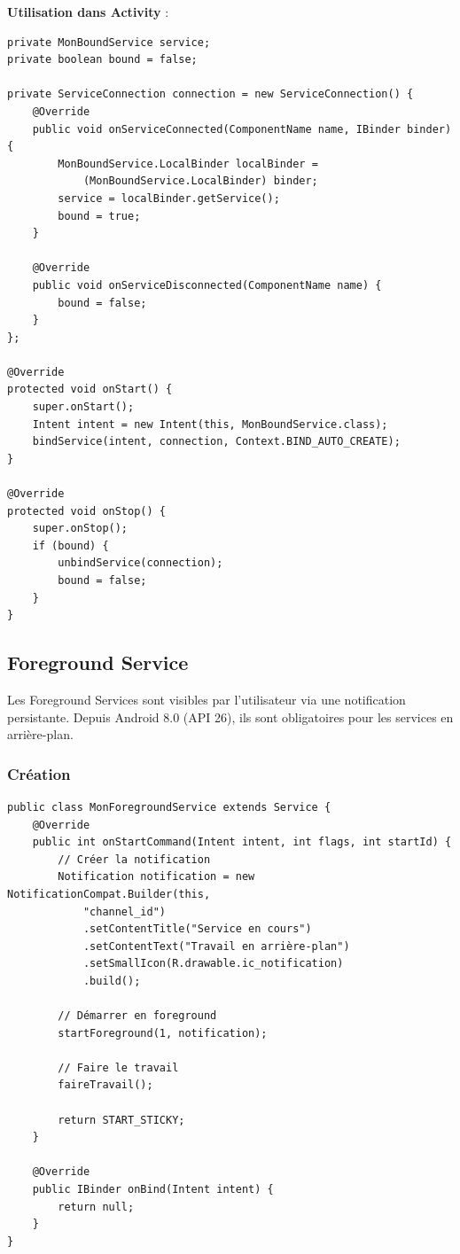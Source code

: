 \documentclass[11pt,a4paper]{article}
\begin{document}
\textbf{Utilisation dans Activity} :
\begin{lstlisting}
private MonBoundService service;
private boolean bound = false;

private ServiceConnection connection = new ServiceConnection() {
    @Override
    public void onServiceConnected(ComponentName name, IBinder binder) {
        MonBoundService.LocalBinder localBinder = 
            (MonBoundService.LocalBinder) binder;
        service = localBinder.getService();
        bound = true;
    }
    
    @Override
    public void onServiceDisconnected(ComponentName name) {
        bound = false;
    }
};

@Override
protected void onStart() {
    super.onStart();
    Intent intent = new Intent(this, MonBoundService.class);
    bindService(intent, connection, Context.BIND_AUTO_CREATE);
}

@Override
protected void onStop() {
    super.onStop();
    if (bound) {
        unbindService(connection);
        bound = false;
    }
}
\end{lstlisting}

\subsection{Foreground Service}

Les Foreground Services sont visibles par l'utilisateur via une notification persistante. Depuis Android 8.0 (API 26), ils sont obligatoires pour les services en arrière-plan.

\subsubsection{Création}

\begin{lstlisting}
public class MonForegroundService extends Service {
    @Override
    public int onStartCommand(Intent intent, int flags, int startId) {
        // Créer la notification
        Notification notification = new NotificationCompat.Builder(this, 
            "channel_id")
            .setContentTitle("Service en cours")
            .setContentText("Travail en arrière-plan")
            .setSmallIcon(R.drawable.ic_notification)
            .build();
        
        // Démarrer en foreground
        startForeground(1, notification);
        
        // Faire le travail
        faireTravail();
        
        return START_STICKY;
    }
    
    @Override
    public IBinder onBind(Intent intent) {
        return null;
    }
}
\end{lstlisting}
\end{document}
